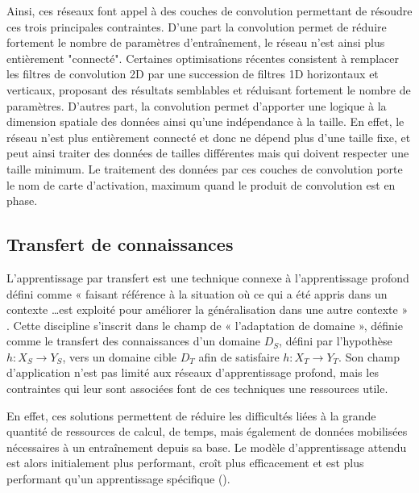 Ainsi, ces réseaux font appel à des couches de convolution permettant de résoudre ces trois principales contraintes. D'une part la convolution permet de réduire fortement le nombre de paramètres d'entraînement, le réseau n'est ainsi plus entièrement "connecté". Certaines optimisations récentes consistent à remplacer les filtres de convolution 2D par une succession de filtres 1D horizontaux et verticaux, proposant des résultats semblables et réduisant fortement le nombre de paramètres. D'autres part, la convolution permet d'apporter une logique à la dimension spatiale des données ainsi qu'une indépendance à la taille. En effet, le réseau n'est plus entièrement connecté et donc ne dépend plus d'une taille fixe, et peut ainsi traiter des données de tailles différentes mais qui doivent respecter une taille minimum. Le traitement des données par ces couches de convolution porte le nom de carte d'activation, maximum quand le produit de convolution est en phase.\par


\clearpage

\subsection{Transfert de connaissances}
\label{sec:transfer_learning}
L’apprentissage par transfert est une technique connexe à l’apprentissage profond défini comme « faisant référence à la situation où ce qui a été appris dans un contexte \ldots est exploité pour améliorer la généralisation dans une autre contexte » \cite{Ngiam2011}. Cette discipline s’inscrit dans le champ de « l’adaptation de domaine », définie comme le transfert des connaissances d’un domaine $D_S$, défini par l’hypothèse $h: X_S \rightarrow Y_S$, vers un domaine cible $D_T$ afin de satisfaire $h: X_T \rightarrow Y_T$. Son champ d'application n'est pas limité aux réseaux d'apprentissage profond, mais les contraintes qui leur sont associées font de ces techniques une ressources utile.\par

En effet, ces solutions permettent de réduire les difficultés liées à la grande quantité de ressources de calcul, de temps, mais également de données mobilisées nécessaires à un entraînement depuis sa base. Le modèle d’apprentissage attendu est alors initialement plus performant, croît plus efficacement et est plus performant qu’un apprentissage spécifique ().\par

